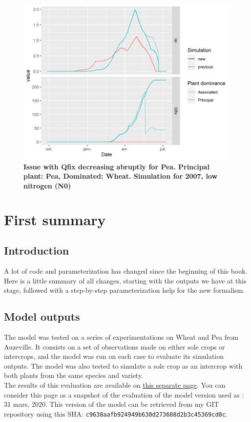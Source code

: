 \documentclass[
]{book}
\begin{document}
\begin{figure}
\centering
\includegraphics{img/Qfix_issue.png}
\caption{\label{fig:Qfix}\textbf{Issue with Qfix decreasing abruptly for Pea. Principal plant: Pea, Dominated: Wheat. Simulation for 2007, low nitrogen (N0)}}
\end{figure}

\hypertarget{summary1}{%
\chapter{First summary}\label{summary1}}

\hypertarget{introduction-11}{%
\section{Introduction}\label{introduction-11}}

A lot of code and parameterization has changed since the beginning of this book. Here is a little summary of all changes, starting with the outputs we have at this stage, followed with a step-by-step parameterization help for the new formalism.

\hypertarget{model-outputs}{%
\section{Model outputs}\label{model-outputs}}

The model was tested on a series of experimentations on Wheat and Pea from Auzeville. It consists on a set of observations made on either sole crops or intercrops, and the model was run on each case to evaluate its simulation outputs. The model was also tested to simulate a sole crop as an intercrop with both plants from the same species and variety.\\
The results of this evaluation are available on \href{Auzeville_summary.html}{this separate page}.
You can consider this page as a snapshot of the evaluation of the model version used as : 31 mars, 2020. This version of the model can be retrieved from my GIT repository using this SHA: \texttt{c9638aafb924949b630d273608d2b3c45369cd0c}.
\end{document}
